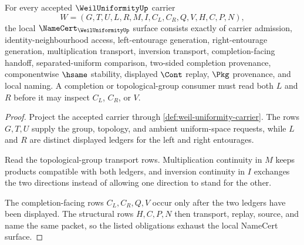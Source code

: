\begin{theorem}
\label{thm:weil-uniformity-namecert-obligations}
For every accepted $\WeilUniformityUp$ carrier
$$
W=(G,T,U,L,R,M,I,C_L,C_R,Q,V,H,C,P,N),
$$
the local $\NameCert_{\WeilUniformityUp}$ surface consists exactly of carrier admission, identity-neighbourhood access, left-entourage generation, right-entourage generation, multiplication transport, inversion transport, completion-facing handoff, separated-uniform comparison, two-sided completion provenance, componentwise $\hsame$ stability, displayed $\Cont$ replay, $\Pkg$ provenance, and local naming. A completion or topological-group consumer must read both $L$ and $R$ before it may inspect $C_L$, $C_R$, or $V$.
\end{theorem}
\begin{proof}
Project the accepted carrier through \autoref{def:weil-uniformity-carrier}. The rows $G,T,U$ supply the group, topology, and ambient uniform-space requests, while $L$ and $R$ are distinct displayed ledgers for the left and right entourages.

Read the topological-group transport rows. Multiplication continuity in $M$ keeps products compatible with both ledgers, and inversion continuity in $I$ exchanges the two directions instead of allowing one direction to stand for the other.

The completion-facing rows $C_L,C_R,Q,V$ occur only after the two ledgers have been displayed. The structural rows $H,C,P,N$ then transport, replay, source, and name the same packet, so the listed obligations exhaust the local NameCert surface.
\end{proof}

